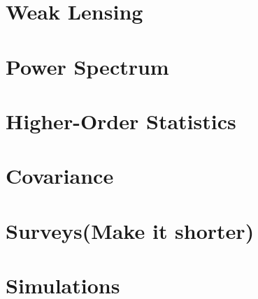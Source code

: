 \documentclass[11pt,a4paper]{ipmu}
\begin{document}
\makethesistitle

%     

\tableofcontents  %
\listoffigures    %
\listoftables     %

% 

%

%

\chapter{Weak Lensing}


\chapter{Power Spectrum}


\chapter{Higher-Order Statistics}





\chapter{Covariance}


\chapter{Surveys(Make it shorter)}






\chapter{Simulations}

\end{document}
